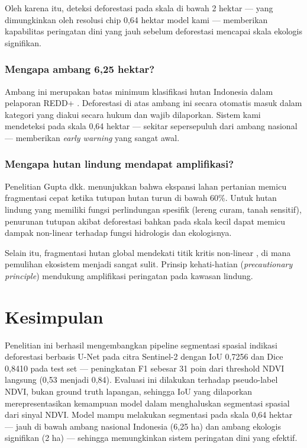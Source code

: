 \documentclass[12pt,a4paper]{article}
\begin{document}
Oleh karena itu, deteksi deforestasi pada skala di bawah 2 hektar — yang
dimungkinkan oleh resolusi chip 0,64 hektar model kami — memberikan kapabilitas
peringatan dini yang jauh sebelum deforestasi mencapai skala ekologis signifikan.

\subsubsection{Mengapa ambang 6,25 hektar?}

Ambang ini merupakan batas minimum klasifikasi hutan Indonesia dalam pelaporan
REDD+ \cite{unfccc2022indonesia, wri2024forest}. Deforestasi di atas ambang ini
secara otomatis masuk dalam kategori yang diakui secara hukum dan wajib
dilaporkan. Sistem kami mendeteksi pada skala 0,64 hektar — sekitar sepersepuluh
dari ambang nasional — memberikan \textit{early warning} yang sangat awal.

\subsubsection{Mengapa hutan lindung mendapat amplifikasi?}

Penelitian Gupta dkk. \cite{gupta2025fragmentation} menunjukkan bahwa ekspansi
lahan pertanian memicu fragmentasi cepat ketika tutupan hutan turun di bawah
60\%. Untuk hutan lindung yang memiliki fungsi perlindungan spesifik (lereng
curam, tanah sensitif), penurunan tutupan akibat deforestasi bahkan pada
skala kecil dapat memicu dampak non-linear terhadap fungsi hidrologis dan
ekologisnya.

Selain itu, fragmentasi hutan global mendekati titik kritis non-linear
\cite{taubert2018fragmentation}, di mana pemulihan ekosistem menjadi sangat
sulit. Prinsip kehati-hatian (\textit{precautionary principle}) mendukung
amplifikasi peringatan pada kawasan lindung.

\section{Kesimpulan}
\label{sec:kesimpulan}

Penelitian ini berhasil mengembangkan pipeline segmentasi spasial indikasi
deforestasi berbasis U-Net pada citra Sentinel-2 dengan IoU 0,7256 dan Dice
0,8410 pada test set — peningkatan F1 sebesar 31 poin dari threshold NDVI
langsung (0,53 menjadi 0,84). Evaluasi ini dilakukan terhadap pseudo-label
NDVI, bukan ground truth lapangan, sehingga IoU yang dilaporkan merepresentasikan
kemampuan model dalam menghaluskan segmentasi spasial dari sinyal NDVI. Model
mampu melakukan segmentasi pada skala 0,64 hektar — jauh di bawah ambang nasional
Indonesia (6,25 ha) dan ambang ekologis signifikan (2 ha) — sehingga memungkinkan
sistem peringatan dini yang efektif.
\end{document}
